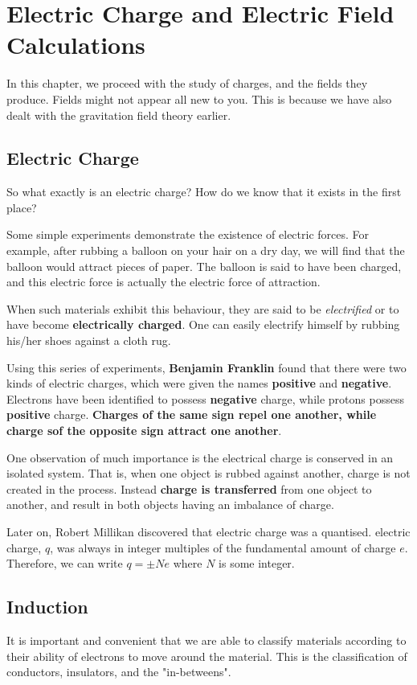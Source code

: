 
\section{Electric Charge and Electric Field Calculations}

In this chapter, we proceed with the study of charges, and the fields they produce. Fields might not appear all new to you. This is because we have also dealt with the gravitation field theory earlier.

\subsection{Electric Charge}
So what exactly is an electric charge? How do we know that it exists in the first place?

Some simple experiments demonstrate the existence of electric forces. For example, after rubbing a balloon on your hair on a dry day, we will find that the balloon would attract pieces of paper. The balloon is said to have been charged, and this electric force is actually the electric force of attraction.

When such materials exhibit this behaviour, they are said to be \emph{electrified} or to have become \textbf{electrically charged}. One can easily electrify himself by rubbing his/her shoes against a cloth rug.

Using this series of experiments, \textbf{Benjamin Franklin} found that there were two kinds of electric charges, which were given the names \textbf{positive} and \textbf{negative}. Electrons have been identified to possess \textbf{negative} charge, while protons possess \textbf{positive} charge. \textbf{Charges of the same sign repel one another, while charge sof the opposite sign attract one another}.

One observation of much importance is the electrical charge is conserved in an isolated system. That is, when one object is rubbed against another, charge is not created in the process. Instead \textbf{charge is transferred} from one object to another, and result in both objects having an imbalance of charge.

Later on, Robert Millikan discovered that electric charge was a quantised. electric charge, $q$, was always in integer multiples of the fundamental amount of charge $e$. Therefore, we can write $q = \pm Ne$ where $N$ is some integer.

\subsection{Induction}
It is important and convenient that we are able to classify materials according to their ability of electrons to move around the material. This is the classification of conductors, insulators, and the "in-betweens".

